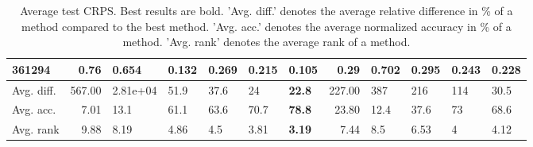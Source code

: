 \begin{table}[ht!]
\begin{tabular}{lrlllllrllll}
  361294 & 0.76 & 0.654 & 0.132 & 0.269 & 0.215 & \textbf{0.105} & 0.29 & 0.702 & 0.295 & 0.243 & 0.228 \\ 
   \hline
Avg. diff. & 567.00 & 2.81e+04 & 51.9 & 37.6 & 24 & \textbf{22.8} & 227.00 & 387 & 216 & 114 & 30.5 \\ 
  Avg. acc. & 7.01 & 13.1 & 61.1 & 63.6 & 70.7 & \textbf{78.8} & 23.80 & 12.4 & 37.6 & 73 & 68.6 \\ 
  Avg. rank & 9.88 & 8.19 & 4.86 & 4.5 & 3.81 & \textbf{3.19} & 7.44 & 8.5 & 6.53 & 4 & 4.12 \\ 
   \hline
\hline
\end{tabular}
\endgroup
\caption{Average test CRPS. 
                  Best results are bold. 
                  'Avg. diff.' denotes the average relative difference in \% of a method compared to the best method.
                  'Avg. acc.' denotes the average normalized accuracy in \% of a method.
                  'Avg. rank' denotes the average rank of a method.} 
\label{TABLES/table_results_CRPS_gower}
\end{table}
